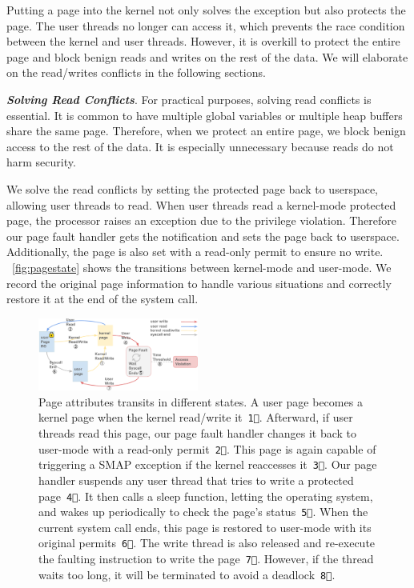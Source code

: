 Putting a page into the kernel not only solves the exception but also protects the page. The user threads no longer can access it, which prevents the race condition between the kernel and user threads. However, it is overkill to protect the entire page and block benign reads and writes on the rest of the data. We will elaborate on the read/writes conflicts in the following sections.



\textbf{\textit{Solving Read Conflicts}}. For practical purposes, solving
read conflicts is essential. It is common to have multiple global
variables or multiple heap buffers share the same page. Therefore, when we protect an entire page, we block benign access to the rest of the data. It is especially unnecessary because reads do not harm security.

We solve the read conflicts by setting the protected page
back to userspace, allowing user threads to read. When user threads read a kernel-mode protected page, the processor raises an exception due to the privilege violation. Therefore our page fault handler gets the notification and sets the page back to userspace. Additionally, the page is also set with a read-only permit to ensure no write. ~\autoref{fig:pagestate} shows the transitions between kernel-mode and user-mode.  We record the original page information to handle various situations and correctly restore it at the end of the system call.


\begin{figure}[th]
  \includegraphics[width=0.47\textwidth]{figures/pagestate6}
  \centering
  \caption{Page attributes transits in different states. A user page becomes a kernel page when the kernel read/write it~\texttt{\textcircled{1}}. Afterward, if user threads read this page, our page fault handler changes it back to user-mode with a read-only permit~\texttt{\textcircled{2}}. This page is again capable of triggering a SMAP exception if the kernel reaccesses it~\texttt{\textcircled{3}}. Our page handler suspends any user thread that tries to write a protected page~\texttt{\textcircled{4}}. It then calls a sleep function, letting the operating system, and wakes up periodically to check the page's status~\texttt{\textcircled{5}}. When the current system call ends, this page is restored to user-mode with its original permits~\texttt{\textcircled{6}}. The write thread is also released and re-execute the faulting instruction to write the page~\texttt{\textcircled{7}}. However, if the thread waits too long, it will be terminated to avoid a deadlock~\texttt{\textcircled{8}}.}
  \label{fig:pagestate}
\end{figure}




